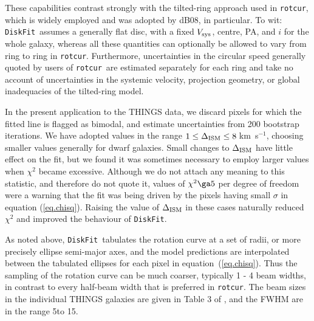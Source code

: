 \documentclass[letterpaper,fleqn,usenatbib]{mnras}
\def\DFt{{\tt DiskFit}}
\def\rtc{{\tt rotcur}}
\begin{document}
These capabilities contrast strongly with the tilted-ring approach
used in \rtc, which is widely employed and was adopted by dB08, in
particular.  To wit: \DFt\ assumes a generally flat disc, with a fixed
$V_{\rm sys}$, centre, PA, and $i$ for the whole galaxy, whereas all
these quantities can optionally be allowed to vary from ring to ring
in \rtc.  Furthermore, uncertainties in the circular speed generally
quoted by users of \rtc\ are estimated separately for each ring and
take no account of uncertainties in the systemic velocity, projection
geometry, or global inadequacies of the tilted-ring model.

In the present application to the THINGS data, we discard pixels for
which the fitted line is flagged as bimodal, and estimate
uncertainties from 200 bootstrap iterations.  We have adopted values
in the range $1 \leq \Delta_{\rm ISM} \leq 8\;$km~s$^{-1}$, choosing
smaller values generally for dwarf galaxies.  Small changes to
$\Delta_{\rm ISM}$ have little effect on the fit, but we found it was
sometimes necessary to employ larger values when $\chi^2$ became
excessive.  Although we do not attach any meaning to this statistic,
and therefore do not quote it, values of $\chi^2 \ga 5$ per degree of
freedom were a warning that the fit was being driven by the pixels
having small $\sigma$ in equation (\ref{eq.chisq}).  Raising the value
of $\Delta_{\rm ISM}$ in these cases naturally reduced $\chi^2$ and
improved the behaviour of \DFt.

As noted above, \DFt\ tabulates the rotation curve at a set of radii,
or more precisely ellipse semi-major axes, and the model predictions
are interpolated between the tabulated ellipses for each pixel in
equation~(\ref{eq.chisq}).  Thus the sampling of the rotation curve
can be much coarser, typically 1 - 4 beam widths, in contrast to every
half-beam width that is preferred in \rtc.  The beam sizes in the
individual THINGS galaxies are given in Table 3 of \citet{Wa08}, and
the FWHM are in the range 5\arcsec to 15\arcsec.
\end{document}
